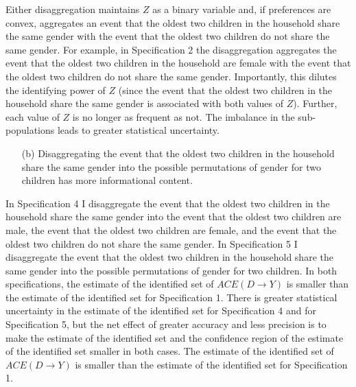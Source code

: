 \documentclass[12pt,a4paper,twoside]{article}
\numberwithin{equation}{section}
\begin{document}
Either disaggregation maintains $Z$ as a binary variable and, if preferences are convex, aggregates an event that the oldest two children in the household share the same gender with the event that the oldest two children do not share the same gender. For example, in Specification 2 the disaggregation aggregates the event that the oldest two children in the household are female with the event that the oldest two children do not share the same gender. Importantly, this dilutes the identifying power of $Z$ (since the event that the oldest two children in the household share the same gender is associated with both values of $Z$). Further, each value of $Z$ is no longer as frequent as not. The imbalance in the sub-populations leads to greater statistical uncertainty. 
\begin{enumerate}
\item[(b)] Disaggregating the event that the oldest two children in the household share the same gender into the possible permutations of gender for two children has more informational content.
\end{enumerate}
In Specification 4 I disaggregate the event that the oldest two children in the household share the same gender into the event that the oldest two children are male, the event that the oldest two children are female, and the event that the oldest two children do not share the same gender. In Specification 5 I disaggregate the event that the oldest two children in the household share the same gender into the possible permutations of gender for two children. In both specifications, the estimate of the identified set of $ACE(D\rightarrow Y)$ is smaller than the estimate of the identified set for Specification 1. There is greater statistical uncertainty in the estimate of the identified set for Specification 4 and for Specification 5, but the net effect of greater accuracy and less precision is to make the estimate of the identified set and the confidence region of the estimate of the identified set smaller in both cases. The estimate of the identified set of $ACE(D\rightarrow Y)$ is smaller than the estimate of the identified set for Specification 1. 
\end{document}
